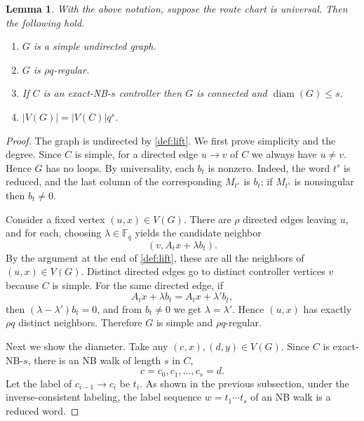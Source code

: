 \documentclass[11pt]{article}
\newtheorem{lemma}[theorem]{Lemma}
\theoremstyle{definition}
\theoremstyle{remark}
\providecommand{\tightlist}{\setlength{\itemsep}{0pt}\setlength{\parskip}{0pt}}
\renewcommand{\_}{\textunderscore\allowbreak}
\begin{document}
\begin{lemma}\label{lem:lift}
With the above notation, suppose the route chart is
universal. Then the following hold.

\begin{enumerate}
\def\labelenumi{\arabic{enumi}.}
\tightlist
\item
  \(G\) is a simple undirected graph.
\item
  \(G\) is \(\rho q\)-regular.
\item
  If \(C\) is an exact-NB-\(s\) controller then \(G\) is connected and
  \(\operatorname{diam}(G)\le s\).
\item
  \(|V(G)|=|V(C)|q^s\).
\end{enumerate}
\end{lemma}

\begin{proof}
The graph is undirected by \cref{def:lift}. We first
prove simplicity and the degree. Since \(C\) is simple, for a directed
edge \(u\to v\) of \(C\) we always have \(u\ne v\). Hence \(G\) has no
loops. By universality, each \(b_t\) is nonzero. Indeed, the word
\(t^s\) is reduced, and the last column of the corresponding \(M_{t^s}\)
is \(b_t\); if \(M_{t^s}\) is nonsingular then \(b_t\ne0\).

Consider a fixed vertex \((u,x)\in V(G)\). There are \(\rho\) directed
edges leaving \(u\), and for each, choosing \(\lambda\in\mathbb F_q\)
yields the candidate neighbor \[
  (v,A_tx+\lambda b_t) .
\] By the argument at the end of \cref{def:lift}, these are all the
neighbors of \((u,x)\in V(G)\). Distinct directed edges go to distinct
controller vertices \(v\) because \(C\) is simple. For the same directed
edge, if \[
  A_tx+\lambda b_t=A_tx+\lambda' b_t ,
\] then \((\lambda-\lambda')b_t=0\), and from \(b_t\ne0\) we get
\(\lambda=\lambda'\). Hence \((u,x)\) has exactly \(\rho q\) distinct
neighbors. Therefore \(G\) is simple and \(\rho q\)-regular.

Next we show the diameter. Take any \((c,x),(d,y)\in V(G)\). Since \(C\)
is exact-NB-\(s\), there is an NB walk of length \(s\) in \(C\), \[
  c=c_0,c_1,\ldots,c_s=d .
\] Let the label of \(c_{i-1}\to c_i\) be \(t_i\). As shown in the
previous subsection, under the inverse-consistent labeling, the label
sequence \(w=t_1\cdots t_s\) of an NB walk is a reduced word.


\end{proof}
\end{document}
